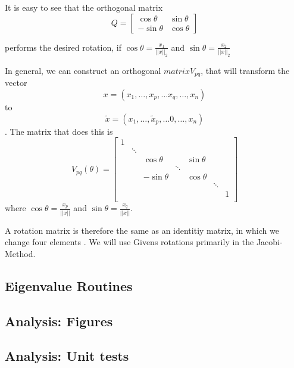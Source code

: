 \documentclass[12pt]{article}
\begin{document}
It is easy to see that the orthogonal matrix
$$Q=\begin{bmatrix}
\cos\theta & \sin\theta \\
-\sin\theta & \cos\theta
\end{bmatrix}$$

performs the desired rotation, if $\cos\theta = \frac{x_1}{||x||_2}$ and $\sin\theta = \frac{x_2}{||x||_2}$

In general, we can construct an orthogonal $matrix V_{pq}$, that will transform the vector $$x = (x_1,\dots, x_p, \dots x_q, \dots, x_n)$$ to $$\tilde{x} = (x_1,\dots, \tilde{x}_p, \dots 0, \dots, x_n)$$. The matrix that does this is
\scriptsize
\begin{equation}
\label{givens-rotation}
V_{pq}(\theta) = \begin{bmatrix}
                      1 \\
                        & \ddots \\
                        &        & \cos\theta    &        & \sin\theta  \\
                        &        &               & \ddots     \\
                        &        & -\sin\theta   &        & \cos\theta   \\
                        &        &               &        &            &  \ddots \\
                        &        &               &        &            &         & 1 \\
                 \end{bmatrix}
\end{equation}
\normalsize
	where $\cos\theta = \frac{x_p}{||x||}$ and $\sin\theta = \frac{x_q}{||x||}.$

A rotation matrix is therefore the same as an identitiy matrix, in which we change four elements \citep[p. 105]{NME}. We will use Givens rotations primarily in the Jacobi-Method.
\newpage

\subsection{Eigenvalue Routines}
  
  
  \newpage
\subsection{Analysis: Figures}
  
  \newpage
\subsection{Analysis: Unit tests}
  
  \newpage


\end{document}
